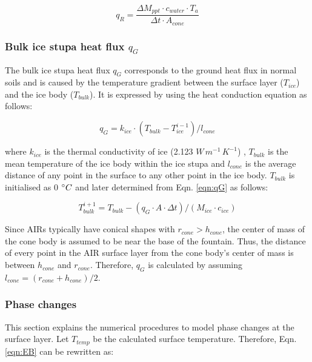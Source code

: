 \begin{equation}
	q_{R} = \frac{ \Delta M_{ppt} \cdot c_{water} \cdot T_a}{\Delta t \cdot A_{cone}}
	\label{eqn:qR}
\end{equation}

\subsubsection{Bulk ice stupa heat flux \texorpdfstring{$q_{G}$}{Lg}} \label{sec:Bulkflux}

The bulk ice stupa heat flux $q_{G}$ corresponds to the ground heat flux in normal soils and is caused by the
temperature gradient between the surface layer ($T_{ice}$) and the ice body ($T_{bulk}$). It is expressed by
using the heat conduction equation as follows:

\begin{equation} q_{G} = k_{ice} \cdot (T_{bulk}-T_{ice}^{i-1})/l_{cone} \label{eqn:qG}    \end{equation}

where $k_{ice}$ is the thermal conductivity of ice (2.123 $W\, m^{-1}\,K^{-1}$) , $T_{bulk}$ is the mean
temperature of the ice body within the ice stupa and $l_{cone}$ is the average distance of any point in the
surface to any other point in the ice body. $T_{bulk}$ is initialised as 0 $^{\circ} C$ and later determined from
Eqn. \ref{eqn:qG} as follows:

\begin{equation} T_{bulk}^{i+1} = T_{bulk} - (q_{G} \cdot A \cdot \Delta t)/(M_{ice} \cdot c_{ice}) \end{equation}

Since \ac{AIRs} typically have conical shapes with $r_{cone} > h_{cone}$, the center of mass of the cone body is
assumed to be near the base of the fountain. Thus, the distance of every point in the AIR surface layer from the
cone body's center of mass is between $h_{cone}$ and $r_{cone}$. Therefore, $q_{G}$ is calculated by assuming
$l_{cone} = (r_{cone} + h_{cone})/2$.

\subsubsection{Phase changes}\label{sec:phase}

This section explains the numerical procedures to model phase changes at the surface layer. Let
$T_{temp}$ be the calculated surface temperature. Therefore, Eqn. \ref{eqn:EB} can be rewritten as:

